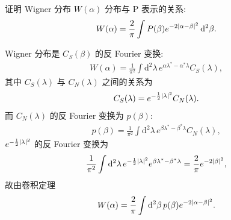 \documentclass{assignment}
\begin{document}
\begin{prob}
    证明 Wigner 分布 $W(\alpha)$ 分布与 P 表示的关系:
    \begin{align}
        W(\alpha)=\frac{2}{\pi}\int P(\beta)e^{-2\left\lvert\alpha-\beta\right\rvert^2}\,\mathrm{d}^2\beta.
    \end{align}
\end{prob}
\begin{pf}
    Wigner 分布是 $C_S(\beta)$ 的反 Fourier 变换:
    \begin{align}
        W(\alpha)=\frac{1}{\pi^2}\int\mathrm{d}^2\lambda\,e^{\alpha\lambda^*-\alpha^*\lambda}C_S(\lambda),
    \end{align}
    其中 $C_S(\lambda)$ 与 $C_N(\lambda)$ 之间的关系为
    \begin{align}
        C_S(\lambda)=e^{-\frac{1}{2}\left\lvert\lambda\right\rvert^2}C_N(\lambda).
    \end{align}
    而 $C_N(\lambda)$ 的反 Fourier 变换为 $p(\beta)$:
    \begin{align}
        p(\beta)=\frac{1}{\pi^2}\int\mathrm{d}^2\lambda\,e^{\beta\lambda^*-\beta^*\lambda}C_N(\lambda),
    \end{align}
    $e^{-\frac{1}{2}\left\lvert\lambda\right\rvert^2}$ 的反 Fourier 变换为
    \begin{align}
        \frac{1}{\pi^2}\int\mathrm{d}^2\lambda\,e^{-\frac{1}{2}\left\lvert\lambda\right\rvert^2}e^{\beta\lambda^*-\beta^*\lambda}=\frac{2}{\pi}e^{-2\left\lvert\beta\right\rvert^2},
    \end{align}
    故由卷积定理
    \begin{align}
        W(\alpha)=\frac{2}{\pi}\int\mathrm{d}^2\beta\,p(\beta)e^{-2\left\lvert\alpha-\beta\right\rvert^2}.
    \end{align}
\end{pf}
\end{document}
